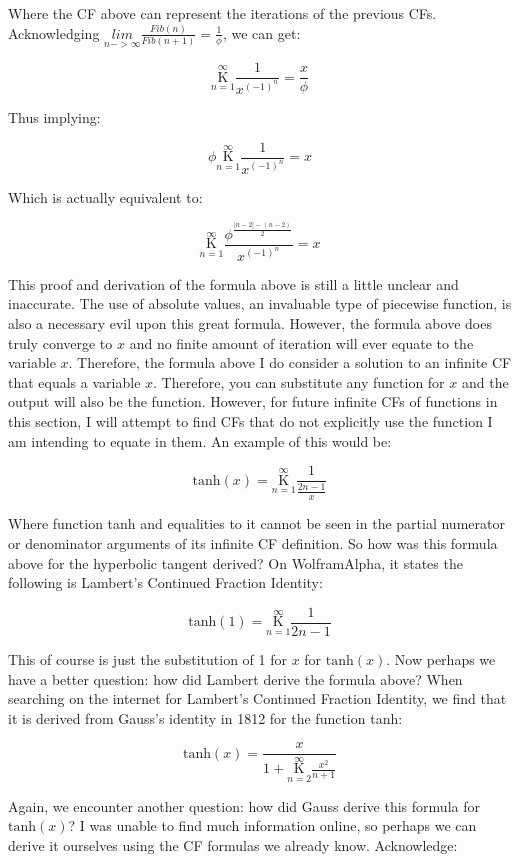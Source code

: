 \documentclass{article}
\begin{document}
Where the CF above can represent the iterations of the previous CFs. Acknowledging $\underset{n->\infty}{lim} \frac{Fib(n)}{Fib(n+1)} = \frac{1}{\phi}$, we can get:

$$\underset{n=1}{\overset{\infty}{\mathrm K}} \frac{1}{x^{(-1)^{n}}}=\frac{x}{\phi}$$

Thus implying:

$$\phi \underset{n=1}{\overset{\infty}{\mathrm K}} \frac{1}{x^{(-1)^{n}}}=x$$

Which is actually equivalent to:

$$\underset{n=1}{\overset{\infty}{\mathrm K}} \frac{\phi ^ {\frac{|n-2|-(n-2)}{2}}}{x^{(-1)^{n}}} = x$$

This proof and derivation of the formula above is still a little unclear and inaccurate. The use of absolute values, an invaluable type of piecewise function, is also a necessary evil upon this great formula. However, the formula above does truly converge to $x$ and no finite amount of iteration will ever equate to the variable $x$. Therefore, the formula above I do consider a solution to an infinite CF that equals a variable $x$. Therefore, you can substitute any function for $x$ and the output will also be the function. However, for future infinite CFs of functions in this section, I will attempt to find CFs that do not explicitly use the function I am intending to equate in them. An example of this would be:

$$\text{tanh}(x)=\underset{n=1}{\overset{\infty}{\mathrm K}} \frac{1}{\frac{2n-1}{x}}$$

Where function tanh and equalities to it cannot be seen in the partial numerator or denominator arguments of its infinite CF definition. So how was this formula above for the hyperbolic tangent derived? On WolframAlpha, it states the following is Lambert’s Continued Fraction Identity:

$$\text{tanh}(1)=\underset{n=1}{\overset{\infty}{\mathrm K}} \frac{1}{2n-1}$$

This of course is just the substitution of 1 for $x$ for $\text{tanh}(x)$. Now perhaps we have a better question: how did Lambert derive the formula above? When searching on the internet for Lambert’s Continued Fraction Identity, we find that it is derived from Gauss’s identity in 1812 for the function tanh:

$$\text{tanh}(x)=\frac{x}{1+\underset{n=2}{\overset{\infty}{\mathrm K}} \frac{x^2}{n+1}}$$

Again, we encounter another question: how did Gauss derive this formula for $\text{tanh}(x)$? I was unable to find much information online, so perhaps we can derive it ourselves using the CF formulas we already know. Acknowledge:
\end{document}
